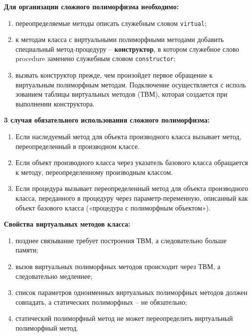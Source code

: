 \noindent
{\bf{Для организации сложного полиморфизма необходимо:}}

\begin{enumerate}
\item переопределяемые методы описать служебным словом {\texttt{virtual}}; 
\item к методам класса с виртуальными полиморфными методами добавить специальный метод-процедуру – {\bf{конструктор}}, в котором служебное слово procedure заменено служебным словом {\texttt{constructor}};
\item вызвать конструктор прежде, чем произойдет первое обращение к виртуальным полиморфным методам.  
Подключение осуществляется с исполь	зованием таблицы виртуальных методов (ТВМ), которая создается при выполнении конструктора.
\end{enumerate}


\noindent
{\bf{3 случая обязательного использования сложного полиморфизма:}}
\begin{enumerate}
\item Если наследуемый метод для объекта производного класса вызывает метод, переопределенный в производном классе.
\item Если объект производного класса через указатель базового класса обращается к методу, переопределенному производным классом.
\item Если процедура вызывает переопределенный метод для объекта производного класса, переданного в процедуру через параметр-переменную, описанный как объект базового класса («процедура с полиморфным объектом»). 
\end{enumerate}

\noindent
{\bf{Свойства виртуальных методов класса:}}
\begin{enumerate}
    \item позднее связывание требует построения ТВМ, а следовательно больше памяти;
    \item вызов виртуальных полиморфных методов происходит через ТВМ, а следовательно медленнее;
    \item список параметров одноименных виртуальных полиморфных методов должен совпадать, а статических полиморфных – не обязательно;
    \item статический полиморфный метод не может переопределить виртуальный полиморфный метод.  
\end{enumerate}




